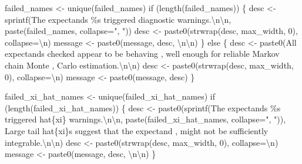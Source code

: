 \documentclass[
  letterpaper,
  DIV=11,
  numbers=noendperiod]{scrartcl}
\newenvironment{Shaded}{\begin{snugshade}}{\end{snugshade}}
\newcommand{\CharTok}[1]{\textcolor[rgb]{0.13,0.47,0.30}{#1}}
\newcommand{\ControlFlowTok}[1]{\textcolor[rgb]{0.00,0.23,0.31}{#1}}
\newcommand{\DecValTok}[1]{\textcolor[rgb]{0.68,0.00,0.00}{#1}}
\newcommand{\NormalTok}[1]{\textcolor[rgb]{0.00,0.23,0.31}{#1}}
\newcommand{\OperatorTok}[1]{\textcolor[rgb]{0.37,0.37,0.37}{#1}}
\newcommand{\SpecialCharTok}[1]{\textcolor[rgb]{0.37,0.37,0.37}{#1}}
\newcommand{\StringTok}[1]{\textcolor[rgb]{0.13,0.47,0.30}{#1}}
\begin{document}
\begin{Shaded}
\begin{Highlighting}[]
\NormalTok{  failed\_names }\OperatorTok{\textless{}{-}}\NormalTok{ unique(failed\_names)}
  \ControlFlowTok{if}\NormalTok{ (length(failed\_names)) \{}
\NormalTok{    desc }\OperatorTok{\textless{}{-}} 
\NormalTok{      sprintf(}\StringTok{\textquotesingle{}The expectands }\SpecialCharTok{\%s}\StringTok{ triggered diagnostic warnings.}\CharTok{\textbackslash{}n\textbackslash{}n}\StringTok{\textquotesingle{}}\NormalTok{,}
\NormalTok{              paste(failed\_names, collapse}\OperatorTok{=}\StringTok{", "}\NormalTok{))}
\NormalTok{    desc }\OperatorTok{\textless{}{-}}\NormalTok{ paste0(strwrap(desc, max\_width, }\DecValTok{0}\NormalTok{), collapse}\OperatorTok{=}\StringTok{\textquotesingle{}}\CharTok{\textbackslash{}n}\StringTok{\textquotesingle{}}\NormalTok{)}
\NormalTok{    message }\OperatorTok{\textless{}{-}}\NormalTok{ paste0(message, desc, }\StringTok{\textquotesingle{}}\CharTok{\textbackslash{}n\textbackslash{}n}\StringTok{\textquotesingle{}}\NormalTok{)}
\NormalTok{  \} }\ControlFlowTok{else}\NormalTok{ \{}
\NormalTok{    desc }\OperatorTok{\textless{}{-}}\NormalTok{ paste0(}\StringTok{\textquotesingle{}All expectands checked appear to be behaving \textquotesingle{}}\NormalTok{,}
                   \StringTok{\textquotesingle{}well enough for reliable Markov chain Monte \textquotesingle{}}\NormalTok{,}
                   \StringTok{\textquotesingle{}Carlo estimation.}\CharTok{\textbackslash{}n\textbackslash{}n}\StringTok{\textquotesingle{}}\NormalTok{)}
\NormalTok{    desc }\OperatorTok{\textless{}{-}}\NormalTok{ paste0(strwrap(desc, max\_width, }\DecValTok{0}\NormalTok{), collapse}\OperatorTok{=}\StringTok{\textquotesingle{}}\CharTok{\textbackslash{}n}\StringTok{\textquotesingle{}}\NormalTok{)}
\NormalTok{    message }\OperatorTok{\textless{}{-}}\NormalTok{ paste0(message, desc)}
\NormalTok{  \}}

\NormalTok{  failed\_xi\_hat\_names }\OperatorTok{\textless{}{-}}\NormalTok{ unique(failed\_xi\_hat\_names)}
  \ControlFlowTok{if}\NormalTok{ (length(failed\_xi\_hat\_names)) \{}
\NormalTok{    desc }\OperatorTok{\textless{}{-}} 
\NormalTok{      paste0(sprintf(}\StringTok{\textquotesingle{}The expectands }\SpecialCharTok{\%s}\StringTok{ triggered hat}\SpecialCharTok{\{xi\}}\StringTok{ warnings.}\CharTok{\textbackslash{}n\textbackslash{}n}\StringTok{\textquotesingle{}}\NormalTok{,}
\NormalTok{             paste(failed\_xi\_hat\_names, collapse}\OperatorTok{=}\StringTok{", "}\NormalTok{)),}
             \StringTok{\textquotesingle{}  Large tail hat}\SpecialCharTok{\{xi\}}\StringTok{s suggest that the expectand \textquotesingle{}}\NormalTok{,}
             \StringTok{\textquotesingle{}might not be sufficiently integrable.}\CharTok{\textbackslash{}n\textbackslash{}n}\StringTok{\textquotesingle{}}\NormalTok{)}
\NormalTok{    desc }\OperatorTok{\textless{}{-}}\NormalTok{ paste0(strwrap(desc, max\_width, }\DecValTok{0}\NormalTok{), collapse}\OperatorTok{=}\StringTok{\textquotesingle{}}\CharTok{\textbackslash{}n}\StringTok{\textquotesingle{}}\NormalTok{)}
\NormalTok{    message }\OperatorTok{\textless{}{-}}\NormalTok{ paste0(message, desc, }\StringTok{\textquotesingle{}}\CharTok{\textbackslash{}n\textbackslash{}n}\StringTok{\textquotesingle{}}\NormalTok{)}
\NormalTok{  \}}
        

\end{Highlighting}
\end{Shaded}
\end{document}
